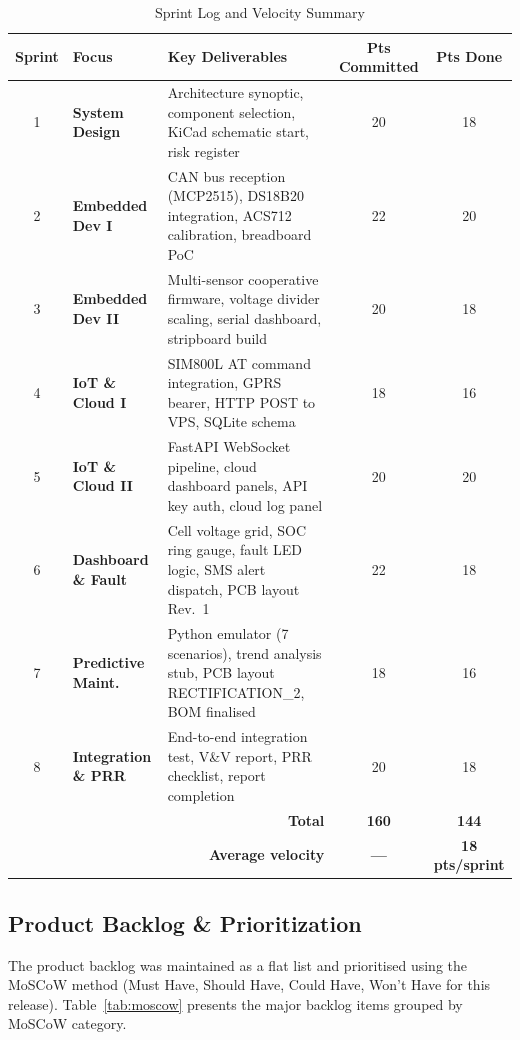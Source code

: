 \begin{table}[H]
\centering
\caption{Sprint Log and Velocity Summary}
\label{tab:sprint-log}
\small
\begin{tabular}{c >{\bfseries}p{3.4cm} p{5.8cm} c c}
\toprule
Sprint & Focus & Key Deliverables & Pts Committed & Pts Done \\
\midrule
1 & System Design        & Architecture synoptic, component selection, KiCad schematic start, risk register & 20 & 18 \\
2 & Embedded Dev I       & CAN bus reception (MCP2515), DS18B20 integration, ACS712 calibration, breadboard PoC & 22 & 20 \\
3 & Embedded Dev II      & Multi-sensor cooperative firmware, voltage divider scaling, serial dashboard, stripboard build & 20 & 18 \\
4 & IoT \& Cloud I       & SIM800L AT command integration, GPRS bearer, HTTP POST to VPS, SQLite schema & 18 & 16 \\
5 & IoT \& Cloud II      & FastAPI WebSocket pipeline, cloud dashboard panels, API key auth, cloud log panel & 20 & 20 \\
6 & Dashboard \& Fault   & Cell voltage grid, SOC ring gauge, fault LED logic, SMS alert dispatch, PCB layout Rev.~1 & 22 & 18 \\
7 & Predictive Maint.    & Python emulator (7 scenarios), trend analysis stub, PCB layout RECTIFICATION\_2, BOM finalised & 18 & 16 \\
8 & Integration \& PRR   & End-to-end integration test, V\&V report, PRR checklist, report completion & 20 & 18 \\
\midrule
\multicolumn{3}{r}{\textbf{Total}} & \textbf{160} & \textbf{144} \\
\multicolumn{3}{r}{\textbf{Average velocity}} & --- & \textbf{18 pts/sprint} \\
\bottomrule
\end{tabular}
\end{table}

\subsection{Product Backlog \& Prioritization}

The product backlog was maintained as a flat list and prioritised using the MoSCoW method (Must Have, Should Have, Could Have, Won't Have for this release). Table~\ref{tab:moscow} presents the major backlog items grouped by MoSCoW category.

